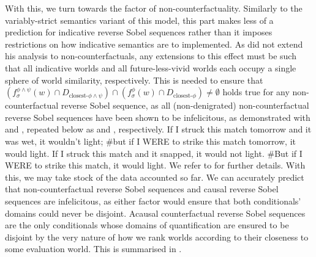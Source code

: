 With this, we turn towards the factor of non-counterfactuality. Similarly to the variably-strict semantics variant of this model, this part makes less of a prediction for indicative reverse Sobel sequences rather than it imposes restrictions on how indicative semantics are to implemented. As \textcite{Fintel2001} did not extend his analysis to non-counterfactuals, any extensions to this effect must be such that all indicative worlds and all future-less-vivid worlds each occupy a single sphere of world similarity, respectively. This is needed to ensure that $(f^{\phi\land\psi}_\sigma(w)\cap D_{\text{closest-}\phi\land\psi})\cap(f^{\phi}_\sigma(w)\cap D_{\text{closest-}\phi})\neq\emptyset$ holds true for any non-counterfactual reverse Sobel sequence, as all (non-denigrated) non-counterfactual reverse Sobel sequences have been shown to be infelicitous, as demonstrated with  and , repeated below as  and , respectively.
\ex{}
    If I struck this match tomorrow and it was wet, it wouldn't light; \#but if I \MakeUppercase{were} to strike this match tomorrow, it would light.
\xe
\ex{}
If I struck this match and it snapped, it would not light. \#But if I \MakeUppercase{were} to strike this match, it would light.
\xe 
We refer to  for further details. With this, we may take stock of the data accounted so far. We can accurately predict that non-counterfactual reverse Sobel sequences and causal reverse Sobel sequences are infelicitous, as either factor would ensure that both conditionals' domains could never be disjoint. Acausal counterfactual reverse Sobel sequences are the only conditionals whose domains of quantification are ensured to be disjoint by the very nature of how we rank worlds according to their closeness to some evaluation world. This is summarised in .
\begin{table}[!htb]
\end{table}

